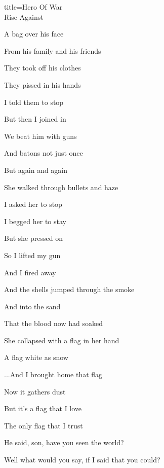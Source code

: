 \begin{song}{title=\predtitle\centering Hero Of War\\\large Rise Against \vspace*{-0.3cm}}
\begin{centerjustified}
\begin{varwidth}[t]{0.48\textwidth}
A bag over his face

From his family and his friends
	
\sloka
They took off his clothes

They pissed in his hands

I told them to stop

But then I joined in

We beat him with guns

And batons not just once

But again and again


\sloka
She walked through bullets and haze

I asked her to stop

I begged her to stay

But she pressed on

So I lifted my gun

And I fired away

\sloka
And the shells jumped through the smoke

And into the sand

That the blood now had soaked

She collapsed with a flag in her hand

A flag white as snow


...And I brought home that flag

Now it gathers dust

But it's a flag that I love

The only flag that I trust


He said, son, have you seen the world?

Well what would you say, if I said that you could?
	
\end{varwidth}

\end{centerjustified}
\setcounter{Slokočet}{0}
\end{song}
